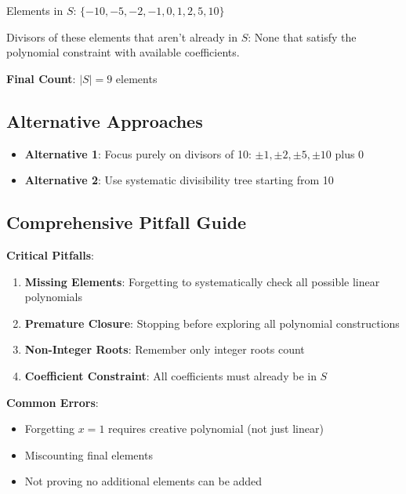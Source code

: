 \documentclass[12pt]{article}
\begin{document}
\begin{roadmapbox}
Elements in $S$: $\{-10, -5, -2, -1, 0, 1, 2, 5, 10\}$

Divisors of these elements that aren't already in $S$: None that satisfy the polynomial constraint with available coefficients.

\textbf{Final Count}: $|S| = 9$ elements

\subsection*{Alternative Approaches}
\begin{itemize}
    \item \textbf{Alternative 1}: Focus purely on divisors of 10: $\pm 1, \pm 2, \pm 5, \pm 10$ plus 0
    \item \textbf{Alternative 2}: Use systematic divisibility tree starting from 10
\end{itemize}

\subsection*{Comprehensive Pitfall Guide}

\textbf{Critical Pitfalls}:
\begin{enumerate}
    \item \textbf{Missing Elements}: Forgetting to systematically check all possible linear polynomials
    \item \textbf{Premature Closure}: Stopping before exploring all polynomial constructions
    \item \textbf{Non-Integer Roots}: Remember only integer roots count
    \item \textbf{Coefficient Constraint}: All coefficients must already be in $S$
\end{enumerate}

\textbf{Common Errors}:
\begin{itemize}
    \item Forgetting $x = 1$ requires creative polynomial (not just linear)
    \item Miscounting final elements
    \item Not proving no additional elements can be added
\end{itemize}

\end{roadmapbox}
\end{document}
